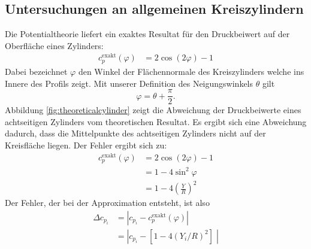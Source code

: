 \subsection{Untersuchungen an allgemeinen Kreiszylindern} \label{chap:analyticalcylinder}
Die Potentialtheorie liefert ein exaktes Resultat für den Druckbeiwert auf der Oberfläche eines Zylinders:\cite{Cebeci:1999}
\begin{align}
c_p^\mathrm{exakt} (\varphi ) &=  2 \cos{(2\varphi )} -1
\end{align}
Dabei bezeichnet $\varphi$ den Winkel der Flächennormale des Kreiszylinders welche ins Innere des Profils zeigt. Mit unserer Definition des Neigungswinkels $\theta$ gilt
\begin{equation}
\varphi = \theta +  \frac{\pi }{2}.
\end{equation}
Abbildung \ref{fig:theoreticalcylinder} zeigt die Abweichung der Druckbeiwerte eines achtseitigen Zylinders vom theoretischen Resultat. Es ergibt sich eine Abweichung dadurch, dass die Mittelpunkte des achtseitigen Zylinders nicht auf der Kreisfläche liegen. Der Fehler ergibt sich zu:
\begin{align}
c_p^\mathrm{exakt} (\varphi ) &=  2 \cos{(2\varphi )} -1 \\
&= 1 - 4 \sin^2 \varphi \\
&= 1 - 4 \left( \frac{Y}{R}\right)^2
\end{align}
Der Fehler, der bei der Approximation entsteht, ist also
\begin{align}
\Delta c_{p_{i}} &= |c_{p_{i}} - c_p^\mathrm{exakt} (\varphi )| \\
&= |c_{p_{i}} -[ 1 - 4 (Y_{i}/R)^2 ] \;|
\end{align}

